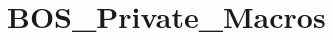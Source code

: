 \hypertarget{group___b_o_s___private___macros}{}\section{B\+O\+S\+\_\+\+Private\+\_\+\+Macros}
\label{group___b_o_s___private___macros}
